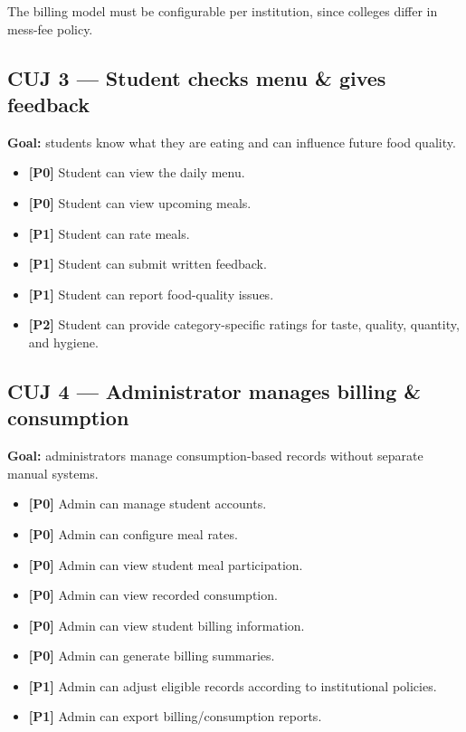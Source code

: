 \documentclass[12pt,a4paper]{article}
\newcommand{\priority}[1]{\textbf{[#1]}}
\begin{document}
The billing model must be configurable per institution, since colleges differ in
mess-fee policy.

\subsection{CUJ 3 --- Student checks menu \& gives feedback}

\textbf{Goal:} students know what they are eating and can influence future food
quality.

\begin{itemize}
    \item \priority{P0} Student can view the daily menu.
    \item \priority{P0} Student can view upcoming meals.
    \item \priority{P1} Student can rate meals.
    \item \priority{P1} Student can submit written feedback.
    \item \priority{P1} Student can report food-quality issues.
    \item \priority{P2} Student can provide category-specific ratings for taste,
          quality, quantity, and hygiene.
\end{itemize}

\subsection{CUJ 4 --- Administrator manages billing \& consumption}

\textbf{Goal:} administrators manage consumption-based records without separate
manual systems.

\begin{itemize}
    \item \priority{P0} Admin can manage student accounts.
    \item \priority{P0} Admin can configure meal rates.
    \item \priority{P0} Admin can view student meal participation.
    \item \priority{P0} Admin can view recorded consumption.
    \item \priority{P0} Admin can view student billing information.
    \item \priority{P0} Admin can generate billing summaries.
    \item \priority{P1} Admin can adjust eligible records according to
          institutional policies.
    \item \priority{P1} Admin can export billing/consumption reports.
\end{itemize}
\end{document}
